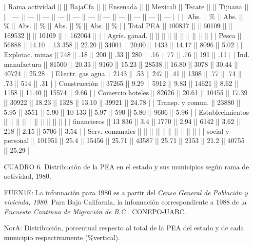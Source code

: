 \documentclass{article}
\begin{document}
| Rama actividad    ||        || BajaCfa ||        || Ensenada ||        || Mexicali || Tecate ||       || Tijuana ||       |
| ---               || ---    || ---     || ---    || ---      || ---    || ---      || ---    || ---   || ---     || ---   |
|                   || Abs.   || \%       || Abs.   || \%        || Abs.   || \%        || Abs.   || \%     || Abs.    || \%     |
| Total PEA         || 400837 ||         || 60109  ||          || 169532 ||          || 10109  ||       || 162064  ||       |
| Agríe. ganad.     ||        ||         ||        ||          ||        ||          ||        ||       ||         ||       |
| Pesca             || 56888  || 14.10   || 13 358 || 22.20    || 34001  || 20;00    || 1433   || 14.17 || 8096    || 5.02  |
| Explotac. minas   || 748    || .18     || 200    || .33      || 280    || .16      || 77     || .76   || 191     || .11   |
| Ind. manufactura  || 81500  || 20.33   || 9160   || 15.23    || 28538  || 16.80    || 3078   || 30.44 || 40724   || 25.28 |
| E1ectr. gas agua  || 2143   || .53     || 247    || .41      || 1308   || .77      || .74    || .73   || 514     || .31   |
| Construcción      || 37265  || 9.29    || 5912   || 9.83     || 14621  || 8.62     || 1158   || 11.40 || 15574   || 9.66  |
| Comercio hoteles  || 82626  || 20.61   || 10455  || 17.39    || 30922  || 18.23    || 1328   || 13.10 || 39921   || 24.78 |
| Transp. y comun.  || 23880  || 5.95    || 3551   || 5.90     || 10 133 || 5.97     || 590    || 5.80  || 9606    || 5.96  |
| Establecimientos  ||        ||         ||        ||          ||        ||          ||        ||       ||         ||       |
| financieros       || 13 836 || 3.4     || 1770   || 2.94     || 6142   || 3.62     || 218    || 2.15  || 5706    || 3.54  |
| Serv. comunales   ||        ||         ||        ||          ||        ||          ||        ||       ||         ||       |
| social y personal || 101951 || 25.4    || 15456  || 25.71    || 43587  || 25.71    || 2153   || 21.2  || 40755   || 25.29 |

CUADRO 6. Distribución de la PEA en el estado y sus municipios según rama de actividad, 1980.

FUEN1E: La infonnación para 1980 es a partir del \textit{Censo General de Población y vivienda, 1980.} Para Baja California, la infonnación correspondiente a 1988 de la \textit{Encuesta Continua de Migración de B.C} . CONEPO-UABC.

NorA: Distribución, porcentual respecto al total de la PEA del estado y de cada municipio respectivamente (\%vertical).
\end{document}
